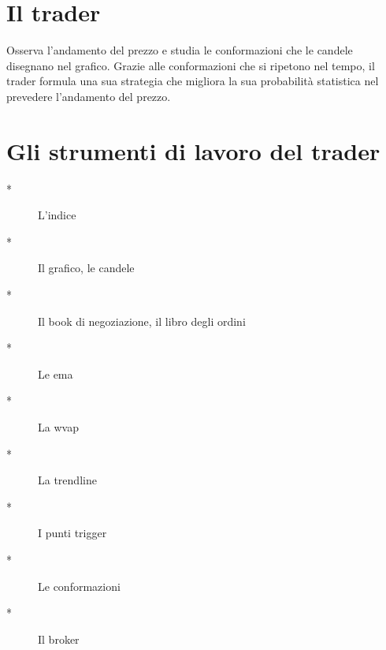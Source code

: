 \documentclass[10pt,a4paper,titlepage]{book}
\begin{document}
\newpage
\section{Il trader} 
Osserva l'andamento del prezzo e studia le conformazioni che le candele disegnano nel grafico. Grazie alle conformazioni che si ripetono nel tempo, il trader formula una sua strategia che migliora la sua probabilità statistica nel prevedere l'andamento del prezzo.

\section{Gli strumenti di lavoro del trader}
\begin{description}
    \item[*] L'indice
    \item[*] Il grafico, le candele
    \item[*] Il book di negoziazione, il libro degli ordini
    \item[*] Le ema
    \item[*] La wvap
    \item[*] La trendline
    \item[*] I punti trigger
    \item[*] Le conformazioni
    \item[*] Il broker
\end{description}



\end{document}
